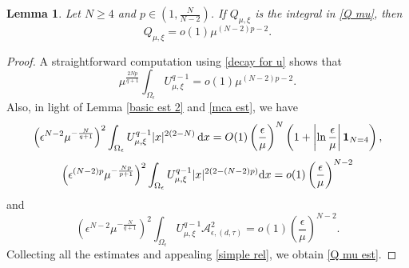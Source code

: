 \documentclass[reqno]{amsart}
\newtheorem{lemma}[theorem]{Lemma}
\theoremstyle{remark}
\newcommand{\ep}{\epsilon}
\newcommand{\mone}{\mathbf{1}}
\newcommand{\mca}{\mathcal{A}}
\newcommand{\dx}{\textup{d}x}
\newcommand{\mx}{{\mu,\xi}}
\renewcommand{\(}{\left(}
\renewcommand{\)}{\right)}
\numberwithin{equation}{section}
\begin{document}
\begin{lemma}\label{high est2}
Let $N \ge 4$ and $p \in (1,\frac{N}{N-2})$. If $Q_\mx$ is the integral in \eqref{Q mu}, then
\begin{equation}\label{Q mu est}
Q_\mx = o(1)\mu^{(N-2)p-2}.
\end{equation}
\end{lemma}
\begin{proof}
A straightforward computation using \eqref{decay for u} shows that
\[\mu^{\frac{2Np}{q+1}}\int_{\Omega_\ep}U_\mx^{q-1}
=o(1)\mu^{(N-2)p-2}.\]
Also, in light of Lemma \ref{basic est 2} and \eqref{mca est}, we have
\[\(\ep^{N-2}\mu^{-\frac{N}{q+1}}\)^2\int_{\Omega_\ep}U_\mx^{q-1} {|x|^{2(2-N)}}\, \dx
= O(1)\(\frac{\ep}{\mu}\)^N\(1 + \left|\ln \frac{\ep}{\mu}\right|\mone_{N=4}\),\]
\[\(\ep^{(N-2)p}\mu^{-\frac{Np}{p+1}}\)^2 \int_{\Omega_\ep} U_\mx^{q-1} |x|^{2(2-(N-2)p)} \dx
= o(1)\(\frac{\ep}{\mu}\)^{N-2}\]
and
\[\(\ep^{N-2}\mu^{-\frac{N}{q+1}}\)^2 \int_{\Omega_\ep} U_\mx^{q-1}\mca_{\ep,(d,\tau)}^2
= o(1)\(\frac{\ep}{\mu}\)^{N-2}.\]
Collecting all the estimates and appealing \eqref{simple rel}, we obtain \eqref{Q mu est}.
\end{proof}
\end{document}
